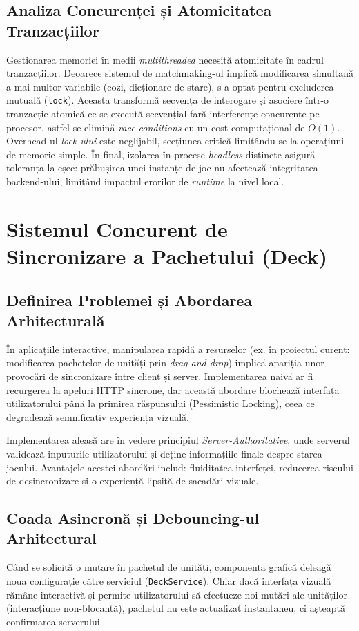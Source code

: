 \subsection{Analiza Concurenței și Atomicitatea Tranzacțiilor}
Gestionarea memoriei în medii \textit{multithreaded} necesită atomicitate în cadrul tranzacțiilor. Deoarece sistemul de matchmaking-ul implică modificarea simultană a mai multor variabile (cozi, dicționare de stare), s-a optat pentru excluderea mutuală (\texttt{lock}). Aceasta transformă secvența de interogare și asociere într-o tranzacție atomică ce se execută secvențial fară interferențe concurente pe procesor, astfel se elimină \textit{race conditions} cu un cost computațional de $O(1)$. Overhead-ul \textit{lock-ului} este neglijabil, secțiunea critică limitându-se la operațiuni de memorie simple. În final, izolarea în procese \textit{headless} distincte asigură toleranța la eșec: prăbușirea unei instanțe de joc nu afectează integritatea backend-ului, limitând impactul erorilor de \textit{runtime} la nivel local.

\section{Sistemul Concurent de Sincronizare a Pachetului (Deck)}
\label{sec:deck_sync}

\subsection{Definirea Problemei și Abordarea Arhitecturală}
În aplicațiile interactive, manipularea rapidă a resurselor (ex. în proiectul curent: modificarea pachetelor de unități prin \textit{drag-and-drop}) implică apariția unor provocări de sincronizare între client și server. Implementarea naivă ar fi recurgerea la apeluri HTTP sincrone, dar această abordare blochează interfața utilizatorului până la primirea răspunsului (Pessimistic Locking), ceea ce degradează semnificativ experiența vizuală.

Implementarea aleasă are în vedere principiul \textit{Server-Authoritative}, unde serverul validează inputurile utilizatorului și deține informațiile finale despre starea jocului. Avantajele acestei abordări includ: fluiditatea interfeței, reducerea riscului de desincronizare și o experiență lipsită de sacadări vizuale.

\subsection{Coada Asincronă și Debouncing-ul Arhitectural}
Când se solicită o mutare în pachetul de unități, componenta grafică deleagă noua configurație către serviciul (\texttt{DeckService}). Chiar dacă interfața vizuală rămâne interactivă și permite utilizatorului să efectueze noi mutări ale unităților (interacțiune non-blocantă), pachetul nu este actualizat instantaneu, ci așteaptă confirmarea serverului.

